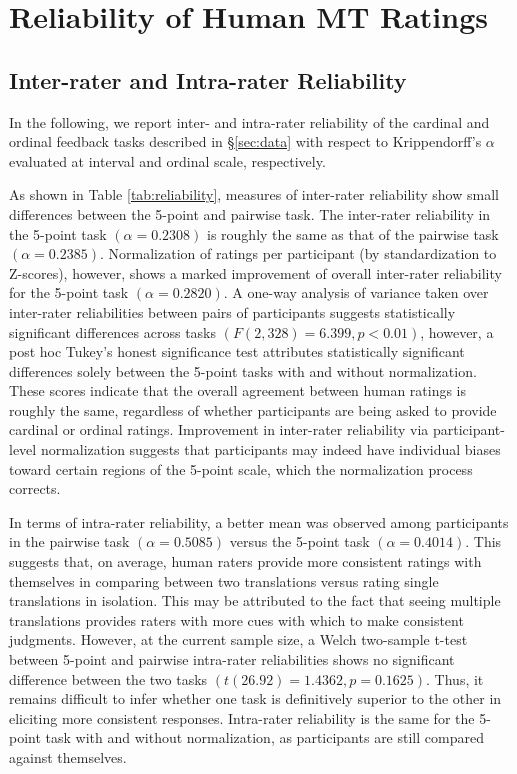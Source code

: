 \section{Reliability of Human MT Ratings}
\label{sec:reliability}

\subsection{Inter-rater and Intra-rater Reliability}

In the following, we report inter- and intra-rater reliability of the cardinal and ordinal feedback tasks described in §\ref{sec:data} with respect to Krippendorff's $\alpha$ \cite{Krippendorff:13} evaluated at interval and ordinal scale, respectively.

As shown in Table \ref{tab:reliability}, measures of inter-rater reliability show small differences between the 5-point and pairwise task. The inter-rater reliability in the 5-point task $\left(\alpha=0.2308\right)$ is roughly the same as that of the pairwise task $\left(\alpha=0.2385\right)$. Normalization of ratings per participant (by standardization to Z-scores), however, shows a marked improvement of overall inter-rater reliability for the 5-point task $\left(\alpha=0.2820\right)$. A one-way analysis of variance taken over inter-rater reliabilities between pairs of participants suggests statistically significant differences across tasks $\left(F\left(2,328\right)=6.399,p<0.01\right)$, however, a post hoc Tukey's \cite{LarsenMarx:12} honest significance test attributes statistically significant differences solely between the 5-point tasks with and without normalization. These scores indicate that the overall agreement between human ratings is roughly the same, regardless of whether participants are being asked to provide cardinal or ordinal ratings. Improvement in inter-rater reliability via participant-level normalization suggests that participants may indeed have individual biases toward certain regions of the 5-point scale, which the normalization process corrects. 

In terms of intra-rater reliability, a better mean was observed among participants in the pairwise task $\left(\alpha=0.5085\right)$ versus the 5-point task $\left(\alpha=0.4014\right)$. This suggests that, on average, human raters provide more consistent ratings with themselves in comparing between two translations versus rating single translations in isolation. This may be attributed to the fact that seeing multiple translations provides raters with more cues with which to make consistent judgments. However, at the current sample size, a Welch two-sample t-test \cite{LarsenMarx:12} between 5-point and pairwise intra-rater reliabilities shows no significant difference between the two tasks $\left(t\left(26.92\right)=1.4362,p=0.1625\right)$. Thus, it remains difficult to infer whether one task is definitively superior to the other in eliciting more consistent responses. Intra-rater reliability is the same for the 5-point task with and without normalization, as participants are still compared against themselves.

